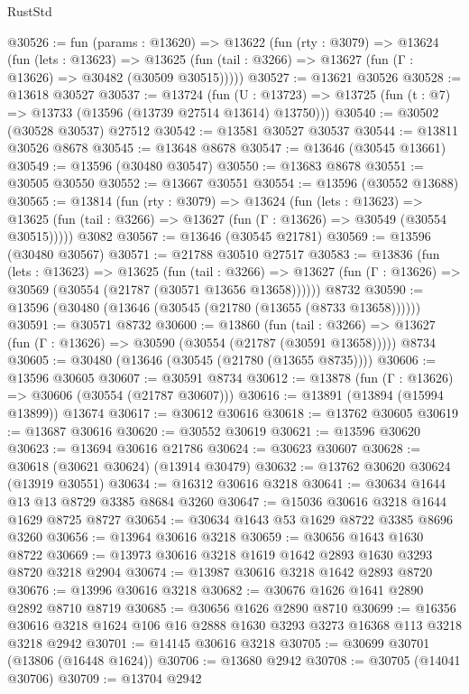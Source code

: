 \begin{lexlean}{RustStd}
\begin{coremodule}
@30526 := fun (params : @13620) =>
  @13622
    (fun (rty : @3079) =>
    @13624
      (fun (lets : @13623) =>
      @13625 (fun (tail : @3266) => @13627 (fun (Γ : @13626) => @30482 (@30509 @30515)))))
@30527 := @13621 @30526
@30528 := @13618 @30527
@30537 := @13724
    (fun (U : @13723) => @13725 (fun (t : @7) => @13733 (@13596 (@13739 @27514 @13614) @13750)))
@30540 := @30502 (@30528 @30537) @27512
@30542 := @13581 @30527 @30537
@30544 := @13811 @30526 @8678
@30545 := @13648 @8678
@30547 := @13646 (@30545 @13661)
@30549 := @13596 (@30480 @30547)
@30550 := @13683 @8678
@30551 := @30505 @30550
@30552 := @13667 @30551
@30554 := @13596 (@30552 @13688)
@30565 := @13814
    (fun (rty : @3079) =>
    @13624
      (fun (lets : @13623) =>
      @13625 (fun (tail : @3266) => @13627 (fun (Γ : @13626) => @30549 (@30554 @30515)))))
    @3082
@30567 := @13646 (@30545 @21781)
@30569 := @13596 (@30480 @30567)
@30571 := @21788 @30510 @27517
@30583 := @13836
    (fun (lets : @13623) =>
    @13625
      (fun (tail : @3266) =>
      @13627 (fun (Γ : @13626) => @30569 (@30554 (@21787 (@30571 @13656 @13658))))))
    @8732
@30590 := @13596 (@30480 (@13646 (@30545 (@21780 (@13655 (@8733 @13658))))))
@30591 := @30571 @8732
@30600 := @13860
    (fun (tail : @3266) => @13627 (fun (Γ : @13626) => @30590 (@30554 (@21787 (@30591 @13658)))))
    @8734
@30605 := @30480 (@13646 (@30545 (@21780 (@13655 @8735))))
@30606 := @13596 @30605
@30607 := @30591 @8734
@30612 := @13878 (fun (Γ : @13626) => @30606 (@30554 (@21787 @30607)))
@30616 := @13891 (@13894 (@15994 @13899)) @13674
@30617 := @30612 @30616
@30618 := @13762 @30605
@30619 := @13687 @30616
@30620 := @30552 @30619
@30621 := @13596 @30620
@30623 := @13694 @30616 @21786
@30624 := @30623 @30607
@30628 := @30618 (@30621 @30624) (@13914 @30479)
@30632 := @13762 @30620 @30624 (@13919 @30551)
@30634 := @16312 @30616 @3218
@30641 := @30634 @1644 @13 @13 @8729 @3385 @8684 @3260
@30647 := @15036 @30616 @3218 @1644 @1629 @8725 @8727
@30654 := @30634 @1643 @53 @1629 @8722 @3385 @8696 @3260
@30656 := @13964 @30616 @3218
@30659 := @30656 @1643 @1630 @8722
@30669 := @13973 @30616 @3218 @1619 @1642 @2893 @1630 @3293 @8720 @3218 @2904
@30674 := @13987 @30616 @3218 @1642 @2893 @8720
@30676 := @13996 @30616 @3218
@30682 := @30676 @1626 @1641 @2890 @2892 @8710 @8719
@30685 := @30656 @1626 @2890 @8710
@30699 := @16356 @30616 @3218 @1624 @106 @16 @2888 @1630 @3293 @3273 @16368 @113 @3218 @3218 @2942
@30701 := @14145 @30616 @3218
@30705 := @30699 @30701 (@13806 (@16448 @1624))
@30706 := @13680 @2942
@30708 := @30705 (@14041 @30706)
@30709 := @13704 @2942

\end{coremodule}
\end{lexlean}
